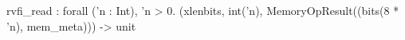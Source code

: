 rvfi_read : forall ('n : Int), 'n > 0. (xlenbits, int('n), MemoryOpResult((bits(8 * 'n), mem_meta))) -> unit